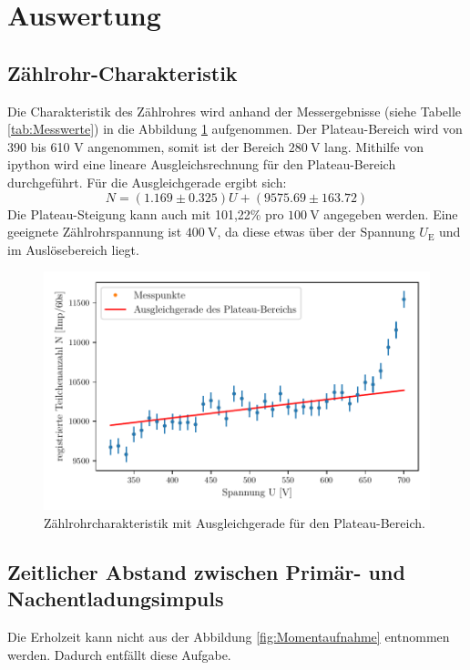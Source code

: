 \section{Auswertung}
\label{sec:Auswertung}
\subsection{Zählrohr-Charakteristik}
\label{subsec:Zählrohr-Charakteristik}
Die Charakteristik des Zählrohres wird anhand der Messergebnisse (siehe Tabelle \ref{tab:Messwerte}) in die Abbildung \ref{fig:Charakteristik} aufgenommen.
Der Plateau-Bereich wird von 390 bis 610 $\si{\volt}$ angenommen, somit ist der Bereich $\SI{280}{\volt}$ lang.
Mithilfe von ipython wird eine lineare Ausgleichsrechnung für den Plateau-Bereich durchgeführt.
Für die Ausgleichgerade ergibt sich:
\begin{equation*}
  N = (1.169 \pm 0.325)U + (9575.69 \pm 163.72)
\end{equation*}
Die Plateau-Steigung kann auch mit 101,22\% pro $\SI{100}{\volt}$ angegeben werden.
Eine geeignete Zählrohrspannung ist $\SI{400}{\volt}$, da diese etwas über der Spannung $U_\text{E}$ und im Auslösebereich liegt.
\begin{figure}
  \centering
  \includegraphics{Plateau_Gerade.pdf}
  \caption{Zählrohrcharakteristik mit Ausgleichgerade für den Plateau-Bereich.}
  \label{fig:Charakteristik}
\end{figure}

\subsection{Zeitlicher Abstand zwischen Primär- und Nachentladungsimpuls}
\label{subsec:Primär_Nachentladung}
Die Erholzeit kann nicht aus der Abbildung \ref{fig:Momentaufnahme} entnommen werden.
Dadurch entfällt diese Aufgabe.

